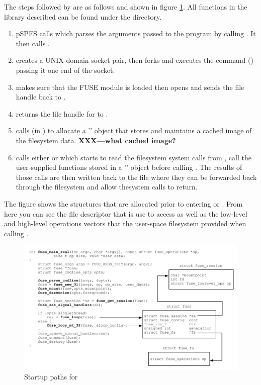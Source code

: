 The steps followed by  are as follows and shown in figure \ref{fig:libfuse-path-and-structs}. All functions in the  library described can be found under the  directory.

\begin{enumerate}
	\item pSPFS calls  which parses the arguments 
		passed to the program by calling . It then calls .
	\item {} creates a UNIX domain socket pair, then forks and executes the 
		 command () passing it one end of the socket.
	\item {} makes sure that the FUSE module is loaded then opens  
		and sends the file handle back to .
	\item {} returns the file handle for  to .
	\item {} calls  (in ) to allocate a '' object that stores 
		and maintains a cached image of the filesystem data. \textbf{XXX---what cached image?}
	\item {} calls either  or  
		which starts to read the filesystem system calls from , call the user-supplied  functions stored in a 
		'' object before calling .  The results of those calls are then written 
		back to the  file where they can be forwarded back through the  filesystem and allow
		thesystem calls to return.
\end{enumerate}

\noindent
The figure shows the structures that are allocated prior to entering  or . From here you can see the file descriptor that is use to access  as well as the low-level and high-level operations vectors that the user-space filesystem provided when calling .

\begin{figure}[h]
	\includegraphics[scale=0.6]{figures/libfuse-path-and-structs.pdf}
	\centering
	\caption{Startup paths for }
	\label{fig:libfuse-path-and-structs}
\end{figure}

